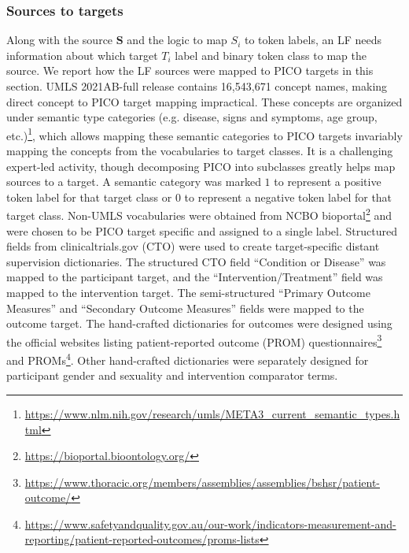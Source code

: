 \documentclass[10.7pt,]{article}
\begin{document}
\subsubsection{Sources to targets}\label{s2t}
%
Along with the source $\bm{S}$ and the logic to map $S_{i}$ to token labels, an LF needs information about which target $T_{i}$ label and binary token class to map the source.
We report how the LF sources were mapped to PICO targets in this section.
UMLS 2021AB-full release contains 16,543,671 concept names, making direct concept to PICO target mapping impractical.
These concepts are organized under semantic type categories (e.g. disease, signs and symptoms, age group, etc.)\footnote{\url{https://www.nlm.nih.gov/research/umls/META3_current_semantic_types.html}}, which allows mapping these semantic categories to PICO targets invariably mapping the concepts from the vocabularies to target classes.\cite{mccray2001aggregating}
It is a challenging expert-led activity, though decomposing PICO into subclasses greatly helps map sources to a target.
A semantic category was marked $1$ to represent a positive token label for that target class or $0$ to represent a negative token label for that target class.
Non-UMLS vocabularies were obtained from NCBO bioportal\footnote{\url{https://bioportal.bioontology.org/}} and were chosen to be PICO target specific and assigned to a single label.
Structured fields from clinicaltrials.gov (CTO) were used to create target-specific distant supervision dictionaries.
The structured CTO field ``Condition or Disease'' was mapped to the participant target, and the ``Intervention/Treatment'' field was mapped to the intervention target.
The semi-structured ``Primary Outcome Measures'' and ``Secondary Outcome Measures'' fields were mapped to the outcome target.
The hand-crafted dictionaries for outcomes were designed using the official websites listing patient-reported outcome (PROM) questionnaires\footnote{\url{https://www.thoracic.org/members/assemblies/assemblies/bshsr/patient-outcome/}} and PROMs\footnote{\url{https://www.safetyandquality.gov.au/our-work/indicators-measurement-and-reporting/patient-reported-outcomes/proms-lists}}.
Other hand-crafted dictionaries were separately designed for participant gender and sexuality and intervention comparator terms.
%
%
%
\end{document}
